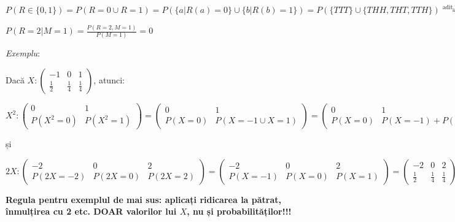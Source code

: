 \documentclass[12pt]{article}
\begin{document}
	$P(R \in \{0,1\}) = P(R = 0 \cup R = 1) = P(\{a | R(a) = 0\} \cup \{b | R(b) = 1\}) = P(\{TTT\} \cup \{THH, THT, TTH\}) \stackrel{\text{adit.num.}}{=} P(\{TTT\}) + P(\{THH, THT, TTH\}) = P(R = 0) + P(R = 1)$
	
	$P(R = 2|M = 1) = \frac{P(R = 2, M = 1)}{P(M = 1)} = 0$
	
	
	
	
	\textit{Exemplu}:
	
	Dacă $X:\begin{pmatrix}
	-1 & 0 & 1\\
	\frac{1}{2} & \frac{1}{4} & \frac{1}{4}
	\end{pmatrix}$, atunci:
	
	$X^2:\begin{pmatrix}
	0 & 1\\
	P(X^2 = 0) & P(X^2 = 1)
	\end{pmatrix} = 
	\begin{pmatrix}
	0 & 1\\
	P(X = 0) & P(X = -1 \cup X = 1)
	\end{pmatrix}=
	\begin{pmatrix}
	0 & 1\\
	P(X = 0) & P(X = -1) + P(X = 1)
	\end{pmatrix} = \begin{pmatrix}
	0 & 1\\
	\frac{1}{4} & \frac{1}{2} + \frac{1}{4}
	\end{pmatrix}$
	
	și
	
	$2X: \begin{pmatrix}
	-2 & 0 & 2\\
	P(2X = -2)&P(2X=0)&P(2X=2)
	\end{pmatrix} = \begin{pmatrix}
	-2 & 0 & 2\\
	P(X = -1)&P(X=0)&P(X=1)
	\end{pmatrix} =
	\begin{pmatrix}
	-2 & 0 & 2\\
	\frac{1}{2} & \frac{1}{4} & \frac{1}{4}
	\end{pmatrix}$

\textbf{	Regula pentru exemplul de mai sus: aplicați ridicarea la pătrat, înmulțirea cu 2 etc. DOAR valorilor lui $X$, nu și probabilităților!!!}
	
\end{document}
